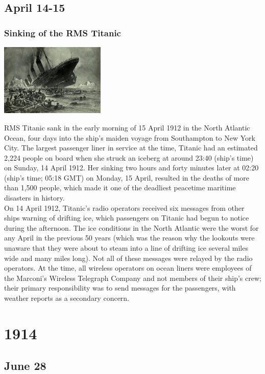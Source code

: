 \documentclass[11pt]{report}
\begin{document}
\section{April 14-15}
\subsection{Sinking of the RMS Titanic}
\vspace{2mm}\begin{center}\includegraphics[width=5cm]{./img/titanicsinking.jpg}\end{center}
RMS Titanic sank in the early morning of 15 April 1912 in the North Atlantic Ocean, four days into the ship's maiden voyage from Southampton to New York City. The largest passenger liner in service at the time, Titanic had an estimated 2,224 people on board when she struck an iceberg at around 23:40 (ship's time) on Sunday, 14 April 1912. Her sinking two hours and forty minutes later at 02:20 (ship's time; 05:18 GMT) on Monday, 15 April, resulted in the deaths of more than 1,500 people, which made it one of the deadliest peacetime maritime disasters in history.\\
On 14 April 1912, Titanic's radio operators received six messages from other ships warning of drifting ice, which passengers on Titanic had begun to notice during the afternoon. The ice conditions in the North Atlantic were the worst for any April in the previous 50 years (which was the reason why the lookouts were unaware that they were about to steam into a line of drifting ice several miles wide and many miles long). Not all of these messages were relayed by the radio operators. At the time, all wireless operators on ocean liners were employees of the Marconi's Wireless Telegraph Company and not members of their ship's crew; their primary responsibility was to send messages for the passengers, with weather reports as a secondary concern.

\chapter{1914}
\section{June 28}
\end{document}
